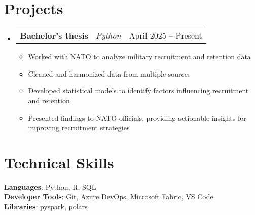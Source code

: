 \documentclass[letterpaper,11pt]{article}
\makeatletter
\newcommand{\resumeItem}[1]{
  \item\small{
    {#1 \vspace{-2pt}}
  }
}
\newcommand{\resumeProjectHeading}[2]{
    \item
    \begin{tabular*}{0.97\textwidth}{l@{\extracolsep{\fill}}r}
      \small#1 & #2 \\
    \end{tabular*}\vspace{-7pt}
}
\newcommand{\resumeSubHeadingListStart}{\begin{itemize}[leftmargin=0.15in, label={}]}
\newcommand{\resumeSubHeadingListEnd}{\end{itemize}}
\newcommand{\resumeItemListStart}{\begin{itemize}}
\newcommand{\resumeItemListEnd}{\end{itemize}\vspace{-5pt}}
\makeatother
\begin{document}
\section{Projects}
    \resumeSubHeadingListStart
      \resumeProjectHeading
          {\textbf{Bachelor's thesis} $|$ \emph{Python}}{April 2025 -- Present}
          \resumeItemListStart
            \resumeItem{Worked with NATO to analyze military recruitment and retention data}
            \resumeItem{Cleaned and harmonized data from multiple sources}
            \resumeItem{Developed statistical models to identify factors influencing recruitment and retention}
            \resumeItem{Presented findings to NATO officials, providing actionable insights for improving recruitment strategies}
          \resumeItemListEnd
    \resumeSubHeadingListEnd



%
\section{Technical Skills}
 \begin{itemize}[leftmargin=0.15in, label={}]
    \small{\item{
     \textbf{Languages}{: Python, R, SQL} \\
     \textbf{Developer Tools}{: Git, Azure DevOps, Microsoft Fabric, VS Code} \\
     \textbf{Libraries}{: pyspark, polars}
    }}
 \end{itemize}


\end{document}
